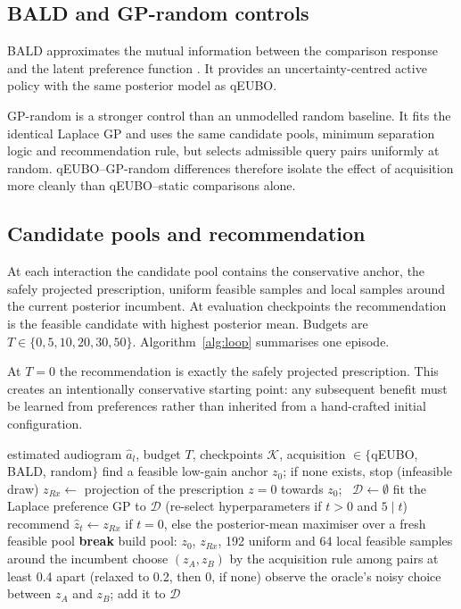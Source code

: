 \documentclass[preprint,12pt]{elsarticle}
\begin{document}
\subsection{BALD and GP-random controls}

BALD approximates the mutual information between the comparison response and the latent preference function \cite{houlsby2011}. It provides an uncertainty-centred active policy with the same posterior model as qEUBO.

GP-random is a stronger control than an unmodelled random baseline. It fits the identical Laplace GP and uses the same candidate pools, minimum separation logic and recommendation rule, but selects admissible query pairs uniformly at random. qEUBO--GP-random differences therefore isolate the effect of acquisition more cleanly than qEUBO--static comparisons alone.

\subsection{Candidate pools and recommendation}

At each interaction the candidate pool contains the conservative anchor, the safely projected prescription, uniform feasible samples and local samples around the current posterior incumbent. At evaluation checkpoints the recommendation is the feasible candidate with highest posterior mean. Budgets are $T\in\{0,5,10,20,30,50\}$. Algorithm~\ref{alg:loop} summarises one episode.

At $T=0$ the recommendation is exactly the safely projected prescription. This creates an intentionally conservative starting point: any subsequent benefit must be learned from preferences rather than inherited from a hand-crafted initial configuration.

\begin{algorithm}[!htbp]
\caption{One AudioTwin episode for listener $l$, context $c$ and family $F$}
\label{alg:loop}
\begin{algorithmic}[1]
\Require estimated audiogram $\hat a_l$, budget $T$, checkpoints $\mathcal K$, acquisition $\in\{$qEUBO, BALD, random$\}$
\State find a feasible low-gain anchor $z_0$; if none exists, stop (infeasible draw)
\State $z_{Rx}\gets$ projection of the prescription $z=0$ towards $z_0$; \ $\mathcal D\gets\emptyset$
  \State fit the Laplace preference GP to $\mathcal D$ (re-select hyperparameters if $t>0$ and $5\mid t$)
     \State recommend $\hat z_t\gets z_{Rx}$ if $t=0$, else the posterior-mean maximiser over a fresh feasible pool
  \EndIf
   \textbf{break} \EndIf
  \State build pool: $z_0$, $z_{Rx}$, 192 uniform and 64 local feasible samples around the incumbent
  \State choose $(z_A,z_B)$ by the acquisition rule among pairs at least 0.4 apart (relaxed to 0.2, then 0, if none)
  \State observe the oracle's noisy choice between $z_A$ and $z_B$; add it to $\mathcal D$
\EndFor
\end{algorithmic}
\end{algorithm}
\end{document}

